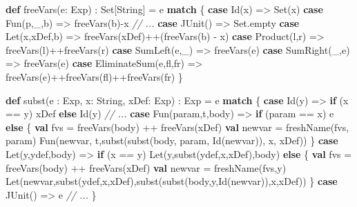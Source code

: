 \documentclass[]{article}
\newenvironment{Shaded}{}{}
\newcommand{\CommentTok}[1]{\textcolor[rgb]{0.38,0.63,0.69}{\textit{#1}}}
\newcommand{\FunctionTok}[1]{\textcolor[rgb]{0.02,0.16,0.49}{#1}}
\newcommand{\KeywordTok}[1]{\textcolor[rgb]{0.00,0.44,0.13}{\textbf{#1}}}
\newcommand{\NormalTok}[1]{#1}
\begin{document}
\begin{Shaded}
\begin{Highlighting}[]
\KeywordTok{def} \FunctionTok{freeVars}\NormalTok{(e: Exp) : Set[String] =  e }\KeywordTok{match}\NormalTok{ \{}
  \KeywordTok{case} \FunctionTok{Id}\NormalTok{(x) =\textgreater{} Set(x)}
  \KeywordTok{case} \FunctionTok{Fun}\NormalTok{(p,\_,b) =\textgreater{} }\FunctionTok{freeVars}\NormalTok{(b){-}x}
  \CommentTok{// ...}
  \KeywordTok{case} \FunctionTok{JUnit}\NormalTok{() =\textgreater{} Set.}\FunctionTok{empty}
  \KeywordTok{case} \FunctionTok{Let}\NormalTok{(x,xDef,b) =\textgreater{} }\FunctionTok{freeVars}\NormalTok{(xDef)++(}\FunctionTok{freeVars}\NormalTok{(b) {-} x)}
  \KeywordTok{case} \FunctionTok{Product}\NormalTok{(l,r) =\textgreater{} }\FunctionTok{freeVars}\NormalTok{(l)++}\FunctionTok{freeVars}\NormalTok{(r)}
  \KeywordTok{case} \FunctionTok{SumLeft}\NormalTok{(e,\_) =\textgreater{} }\FunctionTok{freeVars}\NormalTok{(e)}
  \KeywordTok{case} \FunctionTok{SumRight}\NormalTok{(\_,e) =\textgreater{} }\FunctionTok{freeVars}\NormalTok{(e)}
  \KeywordTok{case} \FunctionTok{EliminateSum}\NormalTok{(e,fl,fr) =\textgreater{} }\FunctionTok{freeVars}\NormalTok{(e)++}\FunctionTok{freeVars}\NormalTok{(fl)++}\FunctionTok{freeVars}\NormalTok{(fr)}
\NormalTok{\}}

\KeywordTok{def} \FunctionTok{subst}\NormalTok{(e : Exp, x: String, xDef: Exp) : Exp = e }\KeywordTok{match}\NormalTok{ \{}
  \KeywordTok{case} \FunctionTok{Id}\NormalTok{(y) =\textgreater{} }\KeywordTok{if}\NormalTok{ (x == y) xDef }\KeywordTok{else} \FunctionTok{Id}\NormalTok{(y)}
  \CommentTok{// ...}
  \KeywordTok{case} \FunctionTok{Fun}\NormalTok{(param,t,body) =\textgreater{}}
    \KeywordTok{if}\NormalTok{ (param == x) e }\KeywordTok{else}\NormalTok{ \{}
      \KeywordTok{val}\NormalTok{ fvs = }\FunctionTok{freeVars}\NormalTok{(body) ++ }\FunctionTok{freeVars}\NormalTok{(xDef)}
      \KeywordTok{val}\NormalTok{ newvar = }\FunctionTok{freshName}\NormalTok{(fvs, param)}
      \FunctionTok{Fun}\NormalTok{(newvar, t,}\FunctionTok{subst}\NormalTok{(}\FunctionTok{subst}\NormalTok{(body, param, }\FunctionTok{Id}\NormalTok{(newvar)), x, xDef))}
\NormalTok{    \}}
  \KeywordTok{case} \FunctionTok{Let}\NormalTok{(y,ydef,body) =\textgreater{}}
    \KeywordTok{if}\NormalTok{ (x == y) }\FunctionTok{Let}\NormalTok{(y,}\FunctionTok{subst}\NormalTok{(ydef,x,xDef),body) }\KeywordTok{else}\NormalTok{ \{}
      \KeywordTok{val}\NormalTok{ fvs = }\FunctionTok{freeVars}\NormalTok{(body) ++ }\FunctionTok{freeVars}\NormalTok{(xDef)}
      \KeywordTok{val}\NormalTok{ newvar = }\FunctionTok{freshName}\NormalTok{(fvs,y)}
      \FunctionTok{Let}\NormalTok{(newvar,}\FunctionTok{subst}\NormalTok{(ydef,x,xDef),}\FunctionTok{subst}\NormalTok{(}\FunctionTok{subst}\NormalTok{(body,y,}\FunctionTok{Id}\NormalTok{(newvar)),x,xDef))}
\NormalTok{    \}}
  \KeywordTok{case} \FunctionTok{JUnit}\NormalTok{() =\textgreater{} e}
  \CommentTok{// ...}
\NormalTok{\}}


\end{Highlighting}
\end{Shaded}
\end{document}
